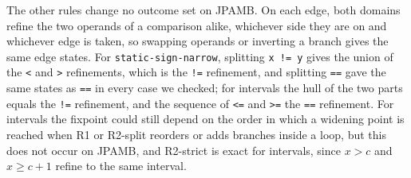 The other rules change no outcome set on JPAMB. On each edge, both domains
refine the two operands of a comparison alike, whichever side they are on and
whichever edge is taken, so swapping operands or inverting a branch gives the
same edge states. For \texttt{static-sign-narrow}, splitting
\texttt{x != y} gives the union of the \texttt{<} and \texttt{>} refinements,
which is the \texttt{!=} refinement, and splitting \texttt{==} gave the same
states as \texttt{==} in every case we checked; for intervals the hull of the two parts equals the
\texttt{!=} refinement, and the sequence of \texttt{<=} and \texttt{>=} the
\texttt{==} refinement. For intervals the fixpoint could still depend on the
order in which a widening point is reached when R1 or R2-split reorders or
adds branches inside a loop, but this does not occur on JPAMB, and R2-strict
is exact for intervals, since $x>c$ and $x\ge c+1$ refine to the same
interval.
